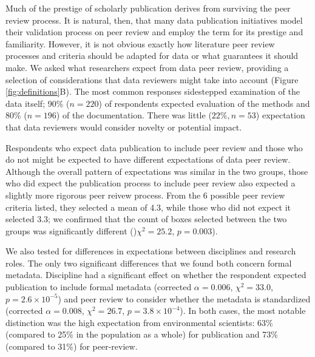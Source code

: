 \documentclass[10pt]{article}
\begin{document}
Much of the prestige of scholarly publication derives from surviving the peer review process.
It is natural, then, that many data publication initiatives model their validation process on peer review and employ the term for its prestige and familiarity.
However, it is not obvious exactly how literature peer review processes and criteria should be adapted for data or what guarantees it should make.
We asked what researchers expect from data peer review, providing a selection of considerations that data reviewers might take into account (Figure \ref{fig:definitions}B).
The most common responses sidestepped examination of the data itself; 90\% ($n=220$) of respondents expected evaluation of the methods and 80\% ($n=196$) of the documentation.
There was little ($22\%, n=53$) expectation that data reviewers would consider novelty or potential impact.

Respondents who expect data publication to include peer review and those who do not might be expected to have different expectations of data peer review. Although the overall pattern of expectations was similar in the two groups, those who did expect the publication process to include peer review also expected a slightly more rigorous peer reivew process. From the 6 possible peer review criteria listed, they selected a mean of 4.3, while those who did not expect it selected 3.3; we confirmed that the count of boxes selected between the two groups was significantly different ()$\chi^{2}= 25.2$, $p= 0.003$). 

We also tested for differences in expectations between disciplines and research roles. The only two significant differences that we found both concern formal metadata. Discipline had a significant effect on whether the respondent expected publication to include formal metadata (corrected $\alpha= 0.006$, $\chi^{2}= 33.0$, $p= 2.6\times10^{-5}$) and peer review to consider whether the metadata is standardized (corrected $\alpha= 0.008$, $\chi^{2}= 26.7$, $p= 3.8\times10^{-4}$). In both cases, the most notable distinction was the high expectation from environmental scientists: 63\% (compared to 25\% in the population as a whole) for publication and 73\% (compared to 31\%) for peer-review.
\end{document}
